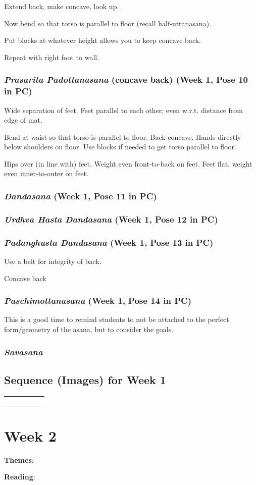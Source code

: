 \documentclass{book}
\newcommand{\apose}[1]{\emph{#1}}
\newcommand{\dand}{\apose{Dandasana}}
\newcommand{\padadand}{\apose{Padanghusta Dandasana}}
\newcommand{\paschi}{\apose{Paschimottanasana}}
\newcommand{\praspad}{\apose{Prasarita Padottanasana}}
\newcommand{\sav}{\apose{Savasana}}
\newcommand{\urdhastdand}{\apose{Urdhva Hasta Dandasana}}
\newcommand{\poseFig}[1]{
  \begin{minipage}{1.0in}
    \texttt{[image: Figures/\{"\#1"]}.jpg}
    \captionof{figure}{{#1}}
    \label{fig:\theweek.#1}
    \vspace{1ex}
  \end{minipage}
}
\newcommand{\dandFig}{\poseFig{Dandasana}}
\newcommand{\namFig}{\poseFig{Namaskarasana}}
\newcommand{\padadandFig}{\poseFig{Padanghusta Dandasana}}
\newcommand{\parshastpadFig}{\poseFig{Parsva Hasta Padasana}}
\newcommand{\parsvoFig}{\poseFig{Parsvottanasana}}
\newcommand{\paschiFig}{\poseFig{Paschimottanasana}}
\newcommand{\praspadFig}{\poseFig{Prasarita Padottanasana}}
\newcommand{\savFig}{\poseFig{Savasana}}
\newcommand{\tadFig}{\poseFig{Tadasana}}
\newcommand{\urdbadFig}{\poseFig{Urdhva Baddhanguliyasana}}
\newcommand{\urdhastFig}{\poseFig{Urdhva Hastasana}}
\newcommand{\urdhastdandFig}{\poseFig{Urdhva Hasta Dandasana}}
\newcommand{\urdnamFig}{\poseFig{Urdhva Namaskarasana}}
\newcommand{\utthastpadFig}{\poseFig{Utthita Hasta Padasana}}
\newcommand{\utttrikFig}{\poseFig{Utthita Trikonasana}}
\newcommand{\PC}[2]{{\normalfont\normalsize \hfill(Week #1, Pose #2 in PC)}}
\newcommand{\newpose}[1]{{{#1}}}
\newcounter{week}
\newcounter{pose}
\newcommand{\week}[1]
{ \IfDecimal{#1}{\setcounter{week}{\integerpart}}{fooey}
  \setcounter{pose}{1}
  \chapter{Week {#1}}}
\newcommand{\pose}{\subsection}
\begin{document}
Extend back, make concave, look up.

Now bend so that torso is parallel to floor (recall half-uttanasana).

Put blocks at whatever height allows you to keep concave back.

Repeat with right foot to wall.

\pose{\newpose{\praspad} (concave back) \PC{1}{10}}

Wide separation of feet. Feet parallel to each other; even
w.r.t. distance from edge of mat.

Bend at waist so that torso is parallel to floor. Back
concave. Hands directly below shoulders on floor. Use blocks if
needed to get torso parallel to floor.

Hips over (in line with) feet. Weight even front-to-back on
feet. Feet flat, weight even inner-to-outer on feet.

\pose{\newpose{\dand}  \PC{1}{11}}

\pose{\newpose{\urdhastdand} \PC{1}{12}}

\pose{\newpose{\padadand} \PC{1}{13}}

Use a belt for integrity of back.

Concave back

\pose{\newpose{\paschi} \PC{1}{14}}

This is a good time to remind students to not be attached to the
perfect form/geometry of the asana, but to consider the goals.

\pose{\sav}

\section{Sequence (Images) for Week 1}
\label{seqimags:1}

\begin{tabular}{|c|c|c|c|c|}
\savFig{} &
\tadFig{} &
\urdhastFig{} &
\urdbadFig{} &
\namFig{} \\ \hline
\urdnamFig{} & 
\utthastpadFig{} &
\parshastpadFig{} &
\utttrikFig{} &
\parsvoFig \\ \hline
\praspadFig &
\dandFig &
\urdhastdandFig &
\padadandFig &
\paschiFig \\ \hline
\savFig & & & &
\end{tabular}



\week{2}
\label{week:2}

\textbf{Themes}: 

\textbf{Reading}:
\end{document}
